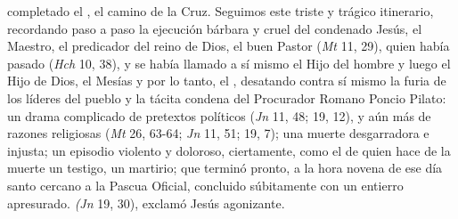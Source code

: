 \begin{body}
 completado el , el camino de la Cruz. Seguimos este triste y trágico itinerario, recordando paso a paso la ejecución bárbara y cruel del condenado Jesús, el Maestro, el predicador del reino de Dios, el buen Pastor  (\textit{Mt} 11, 29), quien había pasado  (\textit{Hch} 10, 38), y se había llamado a sí mismo el Hijo del hombre y luego el Hijo de Dios, el Mesías y por lo tanto, el , desatando contra sí mismo la furia de los líderes del pueblo y la tácita condena del Procurador Romano Poncio Pilato: un drama complicado de pretextos políticos (\textit{Jn} 11, 48; 19, 12), y aún más de razones religiosas (\textit{Mt} 26, 63-64; \textit{Jn} 11, 51; 19, 7); una muerte desgarradora e injusta; un episodio violento y doloroso, ciertamente, como el de quien hace de la muerte un testigo, un martirio; que terminó pronto, a la hora novena de ese día santo cercano a la Pascua Oficial, concluido súbitamente con un entierro apresurado.  \textit{(Jn} 19, 30), exclamó Jesús agonizante.


\end{body}

